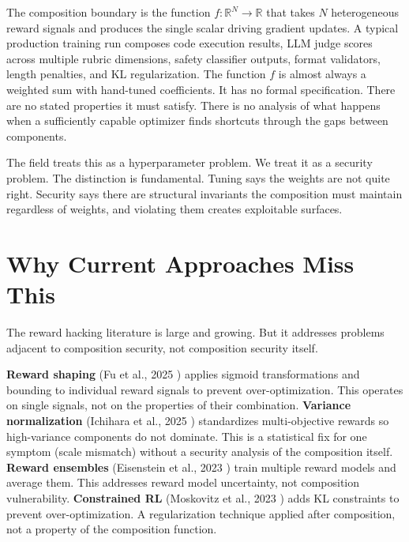 \documentclass[11pt,a4paper]{article}
\begin{document}
The composition boundary is the function $f: \mathbb{R}^N \to \mathbb{R}$ that takes $N$ heterogeneous reward signals and produces the single scalar driving gradient updates. A typical production training run composes code execution results, LLM judge scores across multiple rubric dimensions, safety classifier outputs, format validators, length penalties, and KL regularization. The function $f$ is almost always a weighted sum with hand-tuned coefficients. It has no formal specification. There are no stated properties it must satisfy. There is no analysis of what happens when a sufficiently capable optimizer finds shortcuts through the gaps between components.

The field treats this as a hyperparameter problem. We treat it as a security problem. The distinction is fundamental. Tuning says the weights are not quite right. Security says there are structural invariants the composition must maintain regardless of weights, and violating them creates exploitable surfaces.

\section{Why Current Approaches Miss This}

The reward hacking literature is large and growing. But it addresses problems adjacent to composition security, not composition security itself.

\textbf{Reward shaping} (Fu et al., 2025 \cite{fu2025reward}) applies sigmoid transformations and bounding to individual reward signals to prevent over-optimization. This operates on single signals, not on the properties of their combination. \textbf{Variance normalization} (Ichihara et al., 2025 \cite{ichihara2025variance}) standardizes multi-objective rewards so high-variance components do not dominate. This is a statistical fix for one symptom (scale mismatch) without a security analysis of the composition itself. \textbf{Reward ensembles} (Eisenstein et al., 2023 \cite{eisenstein2023ensemble}) train multiple reward models and average them. This addresses reward model uncertainty, not composition vulnerability. \textbf{Constrained RL} (Moskovitz et al., 2023 \cite{moskovitz2023constrained}) adds KL constraints to prevent over-optimization. A regularization technique applied after composition, not a property of the composition function.
\end{document}
